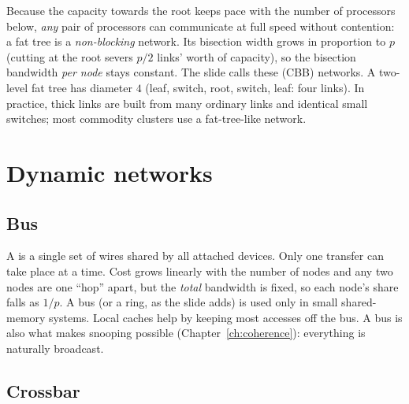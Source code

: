 Because the capacity towards the root keeps pace with the number of processors below, \emph{any} pair of processors can communicate at full
speed without contention: a fat tree is a \emph{non-blocking} network. Its bisection width grows in proportion to $p$ (cutting at the root severs $p/2$ links' worth of
capacity), so the bisection bandwidth \emph{per node} stays constant. The slide calls these  (CBB) networks.
A two-level fat tree has diameter $4$ (leaf, switch, root, switch, leaf: four links). In practice, thick links are built from many ordinary
links and identical small switches; most commodity clusters use a fat-tree-like network.

\section{Dynamic networks}

\subsection{Bus}

A  is a single set of wires shared by all attached devices. Only one transfer can take place at a time. Cost grows
linearly with the number of nodes and any two nodes are one ``hop'' apart, but the \emph{total} bandwidth is fixed, so each node's share falls as $1/p$. A bus
(or a ring, as the slide adds) is used only in small shared-memory systems. Local caches help by keeping most accesses off the bus. A bus is also what makes snooping
possible (Chapter~\ref{ch:coherence}): everything is naturally broadcast.

\subsection{Crossbar}

\begin{center}
\end{center}

